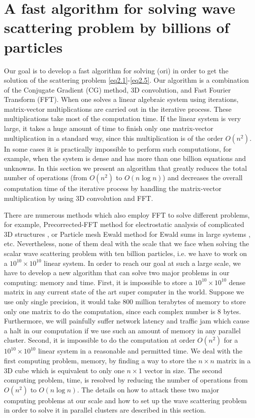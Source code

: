 \documentclass[12pt]{elsarticle}
\numberwithin{equation}{section}
\begin{document}
\section{A fast algorithm for solving wave scattering problem by billions of particles} \label{sec3}
Our goal is to develop a fast algorithm for solving (ori) in order to get the solution of the scattering problem \eqref{eq2.1}-\eqref{eq2.5}. Our algorithm is a combination of the Conjugate Gradient (CG) method, 3D convolution, and Fast Fourier Transform (FFT). When one solves a linear algebraic system using iterations, matrix-vector multiplications are carried out in the iterative process. These multiplications take most of the computation time. If the linear system is very large, it takes a huge amount of time to finish only one matrix-vector multiplication in a standard way, since this multiplication is of the order $O(n^2)$. In some cases it is practically impossible to perform such computations, for example, when the system is dense and has more than one billion equations and unknowns. In this section we present an algorithm that  greatly reduces the total number of operations (from $O(n^2)$ to $O(n\log n)$) and decreases the overall computation time of the iterative process by handling the matrix-vector multiplication by using 3D convolution and FFT.

There are numerous methods which also employ FFT to solve different problems, for example, Precorrected-FFT method for electrostatic analysis of complicated 3D structures \cite{PhilWhite}, or Particle mesh Ewald method for Ewald sums in large systems \cite{DardenYorkPedersen}, etc. Nevertheless, none of them deal with the scale that we face when solving the scalar wave scattering problem with ten billion particles, i.e. we have to work on a $10^{10} \times 10^{10}$ linear system. In order to reach our goal at such a large scale, we have to develop a new algorithm that can solve two major problems in our computing: memory and time. First, it is impossible to store a $10^{10} \times 10^{10}$ dense matrix in any current state of the art super computer in the world. Suppose we use only single precision, it would take 800 million terabytes of memory to store only one matrix to do the computation, since each complex number is 8 bytes. Furthermore, we will painfully suffer network latency and traffic jam which cause a halt in our computation if we use such an amount of memory in any parallel cluster. Second, it is impossible to do the computation at order $O(n^2)$ for a $10^{10} \times 10^{10}$ linear system in a reasonable and permitted time. We deal with the first computing problem, memory, by finding a way to store the $n \times n$ matrix in a 3D cube which is equivalent to only one $n \times 1$ vector in size. The second computing problem, time, is resolved by reducing the number of operations from $O(n^2)$ to $O(n\log n)$. The details on how to attack these two major computing problems at our scale and how to set up the wave scattering problem in order to solve it in parallel clusters are described in this section.
\end{document}
